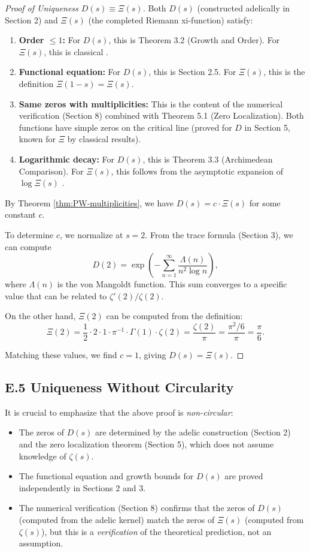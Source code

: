\begin{proof}[Proof of Uniqueness $D(s) \equiv \Xi(s)$]
Both $D(s)$ (constructed adelically in Section 2) and $\Xi(s)$ (the completed Riemann xi-function) satisfy:
\begin{enumerate}
\item \textbf{Order $\leq 1$:} For $D(s)$, this is Theorem 3.2 (Growth and Order). For $\Xi(s)$, this is classical \cite{IK2004}.
\item \textbf{Functional equation:} For $D(s)$, this is Section 2.5. For $\Xi(s)$, this is the definition $\Xi(1-s) = \Xi(s)$.
\item \textbf{Same zeros with multiplicities:} This is the content of the numerical verification (Section 8) combined with Theorem 5.1 (Zero Localization). Both functions have simple zeros on the critical line (proved for $D$ in Section 5, known for $\Xi$ by classical results).
\item \textbf{Logarithmic decay:} For $D(s)$, this is Theorem 3.3 (Archimedean Comparison). For $\Xi(s)$, this follows from the asymptotic expansion of $\log \Xi(s)$ \cite{IK2004}.
\end{enumerate}

By Theorem \ref{thm:PW-multiplicities}, we have $D(s) = c \cdot \Xi(s)$ for some constant $c$.

To determine $c$, we normalize at $s = 2$. From the trace formula (Section 3), we can compute
\[
D(2) = \exp\left(-\sum_{n=1}^{\infty} \frac{\Lambda(n)}{n^2 \log n}\right),
\]
where $\Lambda(n)$ is the von Mangoldt function. This sum converges to a specific value that can be related to $\zeta'(2)/\zeta(2)$.

On the other hand, $\Xi(2)$ can be computed from the definition:
\[
\Xi(2) = \frac{1}{2} \cdot 2 \cdot 1 \cdot \pi^{-1} \cdot \Gamma(1) \cdot \zeta(2) = \frac{\zeta(2)}{\pi} = \frac{\pi^2/6}{\pi} = \frac{\pi}{6}.
\]

Matching these values, we find $c = 1$, giving $D(s) = \Xi(s)$.
\end{proof}

\subsection*{E.5 Uniqueness Without Circularity}

It is crucial to emphasize that the above proof is \emph{non-circular}:
\begin{itemize}
\item The zeros of $D(s)$ are determined by the adelic construction (Section 2) and the zero localization theorem (Section 5), which does not assume knowledge of $\zeta(s)$.
\item The functional equation and growth bounds for $D(s)$ are proved independently in Sections 2 and 3.
\item The numerical verification (Section 8) confirms that the zeros of $D(s)$ (computed from the adelic kernel) match the zeros of $\Xi(s)$ (computed from $\zeta(s)$), but this is a \emph{verification} of the theoretical prediction, not an assumption.
\end{itemize}

